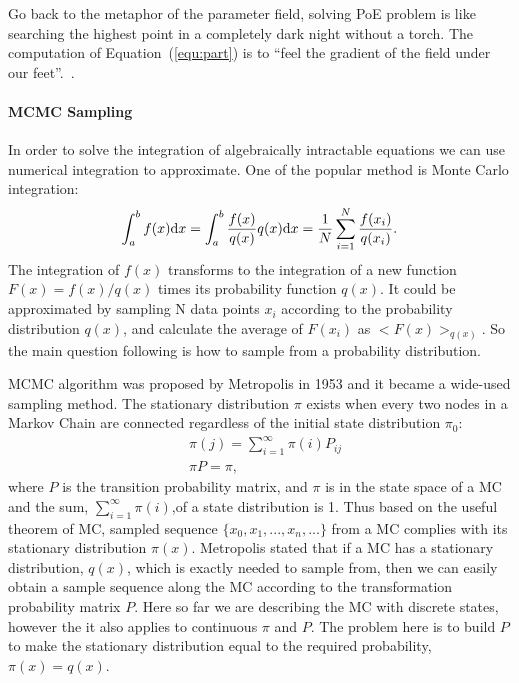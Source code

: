 Go back to the metaphor of the parameter field, solving PoE problem is like searching the highest point in a completely dark night without a torch.
The computation of Equation~(\ref{equ:part}) is to ``feel the gradient of the field under our feet''.~\cite{woodfordnotes}.

\paragraph{MCMC Sampling}
\label{sec:mcmc}
In order to solve the integration of algebraically intractable equations we can use numerical integration to approximate.
One of the popular method is Monte Carlo integration:
\begin{equation}
\int_{a}^{b} f(x) \mathrm{d} x = \int_{a}^{b}\frac{f(x)}{q(x)}q(x)\mathrm{d} x = \dfrac{1}{N}\sum_{i=1}^{N}\frac{f(x_i)}{q(x_i)}.
\end{equation}
The integration of $ f(x) $ transforms to the integration of a new function $ F(x) = f(x)/q(x)  $ times its probability function $ q(x) $.
It could be approximated by sampling N data points $ x_i $ according to the probability distribution $ q(x) $, and calculate the average of $ F(x_i) $ as $ <F(x)>_{q(x)}$.
So the main question following is how to sample from a probability distribution.

MCMC algorithm was proposed by Metropolis in 1953 and it became a wide-used sampling method.
The stationary distribution $ \pi $ exists when every two nodes in a Markov Chain are connected regardless of the initial state distribution $ \pi_0 $:
\begin{equation}
\begin{aligned}
&\pi(j) = \sum_{i=1}^{\infty}\pi(i)P_{ij} \\
&\pi P = \pi,
\end{aligned}
\end{equation}
where $ P $ is the transition probability matrix, and $ \pi $ is in the state space of a MC and the sum, $ \sum_{i=1}^{\infty}\pi(i) $,of a state distribution is 1.
Thus based on the useful theorem of MC, sampled sequence $ \{x_0, x_1, ..., x_n, ... \}$ from a MC complies with its stationary distribution $ \pi(x) $.
Metropolis stated that if a MC has a stationary distribution, $ q(x) $, which is exactly needed to sample from, then we can easily obtain a sample sequence along the MC according to the transformation probability matrix $ P $.
Here so far we are describing the MC with discrete states, however the it also applies to continuous $ \pi $ and $ P $.
The problem here is to build $ P $ to make the stationary distribution equal to the required probability, $ \pi(x) = q(x) $.

